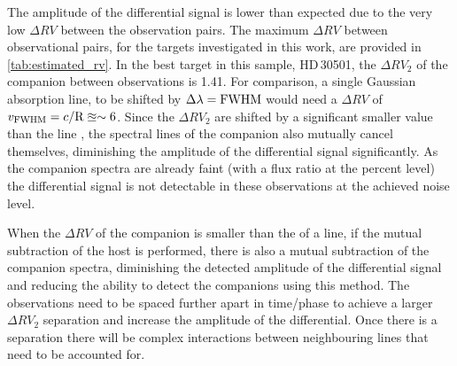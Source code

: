 The amplitude of the differential signal is lower than expected due to the very low \(\Delta {RV}\) between the observation pairs.
The maximum \(\Delta {RV}\) between observational pairs, for the targets investigated in this work, are provided in \cref{tab:estimated_rv}.
In the best target in this sample, {HD\,30501}, the \(\Delta {RV}_2\) of the companion between observations is 1.41\kmps{}.
For comparison, a single Gaussian absorption line, to be shifted by \(\Delta\lambda = {\textrm{FWHM}}\) would need a \(\Delta {RV}\) of \(v_{\textrm{FWHM}} = c/\textrm{R} \approxeq\sim6\)\kmps{}.
Since the \(\Delta {RV}_2\) are shifted by a significant smaller value than the line {\fwhm}, the spectral lines of the companion also mutually cancel themselves, diminishing the amplitude of the differential signal significantly.
As the companion spectra are already faint (with a flux ratio at the percent level) the differential signal is not detectable in these observations at the achieved noise level.

When the \(\Delta {RV}\) of the companion is smaller than the {\fwhm} of a line, if the mutual subtraction of the host is performed, there is also a mutual subtraction of the companion spectra, diminishing the detected amplitude of the differential signal and reducing the ability to detect the companions using this method.
The observations need to be spaced further apart in time/phase to achieve a larger \(\Delta {RV}_2\) separation and increase the amplitude of the differential.
Once there is a separation there will be complex interactions between neighbouring lines that need to be accounted for.


